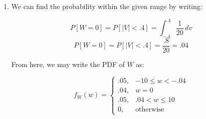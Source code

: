 \begin{enumerate}
  \item We can find the probability within the given range by writing:

    $$P[W=0]=P[|V|<.4]=\int_{-.4}^{.4}\frac{1}{20}\,dv$$
    $$\boxed{P[W=0]=P[|V|<.4]=\frac{.8}{20}=.04}$$

    From here, we may write the PDF of $W$ as:

    $$\boxed{f_W(w)=\left\{\begin{array}{ll} .05, & -10\leq w< -.04\\ .04, & w=0\\ .05, & .04< w\leq 10\\ 0, & \text{otherwise}\end{array}}$$

\end{enumerate}



